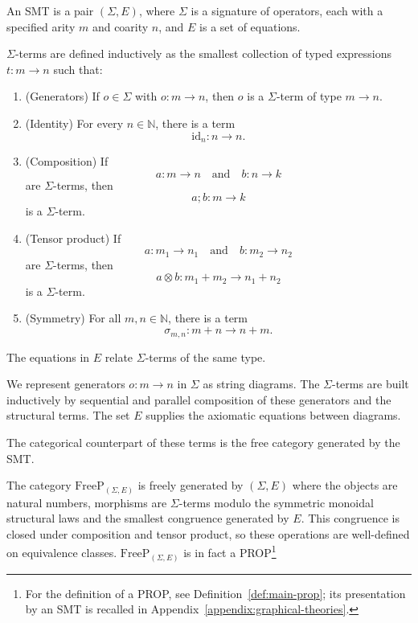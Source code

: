 \begin{definition}
	An SMT is a pair $(\Sigma,E)$, where $\Sigma$ is a signature of operators,
	each with a specified arity $m$ and coarity $n$, and $E$ is a set of equations.

	\medskip

	$\Sigma$-terms are defined inductively as the smallest collection of
	typed expressions $t : m \to n$ such that:

	\begin{enumerate}

		\item (Generators) If $o \in \Sigma$ with $o : m \to n$, then $o$ is a $\Sigma$-term of type $m \to n$.
		\item (Identity)
		      For every $n \in \mathbb{N}$, there is a term
		      \[
			      \mathrm{id}_n : n \to n.
		      \]

		\item (Composition)
		      If
		      \[
			      a : m \to n
			      \quad \text{and} \quad
			      b : n \to k
		      \]
		      are $\Sigma$-terms, then
		      \[
			      a ; b : m \to k
		      \]
		      is a $\Sigma$-term.

		\item (Tensor product)
		      If
		      \[
			      a : m_1 \to n_1
			      \quad \text{and} \quad
			      b : m_2 \to n_2
		      \]
		      are $\Sigma$-terms, then
		      \[
			      a \otimes b : m_1 + m_2 \to n_1 + n_2
		      \]
		      is a $\Sigma$-term.

		\item (Symmetry)   For all $m,n \in \mathbb{N}$, there is a term
		      \[
			      \sigma_{m,n} : m+n \to n+m.
		      \]
	\end{enumerate}

	\medskip

	The equations in $E$ relate $\Sigma$-terms of the same type.
\end{definition}

We represent generators $o:m\to n$ in $\Sigma$ as string diagrams.
The $\Sigma$-terms are built inductively by sequential and parallel composition
of these generators and the structural terms. The set $E$ supplies the
axiomatic equations between diagrams.

The categorical counterpart of these terms is the free category generated by the SMT.

\begin{definition}
	The category $\text{FreeP}_{(\Sigma,E)}$ is freely generated by $(\Sigma,E)$ where the objects are natural numbers, morphisms are $\Sigma$-terms modulo the symmetric monoidal structural laws and the smallest congruence generated by $E$. This congruence is closed under composition and tensor product, so these operations are well-defined on equivalence classes. $\text{FreeP}_{(\Sigma,E)}$ is in fact a PROP\footnote{For the definition of a PROP, see Definition~\ref{def:main-prop};
its presentation by an SMT is recalled in Appendix~\ref{appendix:graphical-theories}.}
\end{definition}

